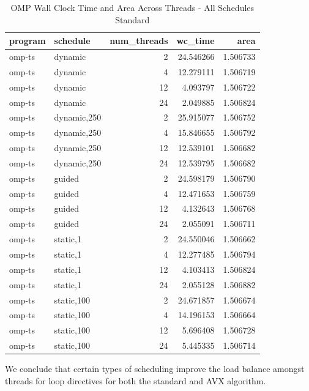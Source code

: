 \documentclass{article}
\begin{document}
\begin{table}[H]
    \centering
    \caption{OMP Wall Clock Time and Area Across Threads - All Schedules Standard}
    \centering
    \fontsize{12}{14}\selectfont
    \begin{tabular}[t]{l|l|r|r|r}
    \hline
    program & schedule & num\_threads & wc\_time & area\\
    \hline
    omp-ts & dynamic & 2 & 24.546266 & 1.506733\\
    \hline
    omp-ts & dynamic & 4 & 12.279111 & 1.506719\\
    \hline
    omp-ts & dynamic & 12 & 4.093797 & 1.506722\\
    \hline
    omp-ts & dynamic & 24 & 2.049885 & 1.506824\\
    \hline
    omp-ts & dynamic,250 & 2 & 25.915077 & 1.506752\\
    \hline
    omp-ts & dynamic,250 & 4 & 15.846655 & 1.506792\\
    \hline
    omp-ts & dynamic,250 & 12 & 12.539101 & 1.506682\\
    \hline
    omp-ts & dynamic,250 & 24 & 12.539795 & 1.506682\\
    \hline
    omp-ts & guided & 2 & 24.598179 & 1.506790\\
    \hline
    omp-ts & guided & 4 & 12.471653 & 1.506759\\
    \hline
    omp-ts & guided & 12 & 4.132643 & 1.506768\\
    \hline
    omp-ts & guided & 24 & 2.055091 & 1.506711\\
    \hline
    omp-ts & static,1 & 2 & 24.550046 & 1.506662\\
    \hline
    omp-ts & static,1 & 4 & 12.277485 & 1.506794\\
    \hline
    omp-ts & static,1 & 12 & 4.103413 & 1.506824\\
    \hline
    omp-ts & static,1 & 24 & 2.055128 & 1.506882\\
    \hline
    omp-ts & static,100 & 2 & 24.671857 & 1.506674\\
    \hline
    omp-ts & static,100 & 4 & 14.196153 & 1.506664\\
    \hline
    omp-ts & static,100 & 12 & 5.696408 & 1.506728\\
    \hline
    omp-ts & static,100 & 24 & 5.445335 & 1.506714\\
    \hline
    \end{tabular}
\end{table}
\noindent We conclude that certain types of scheduling improve the load balance amongst 
threads for loop directives for both the standard and AVX algorithm. 
\end{document}
